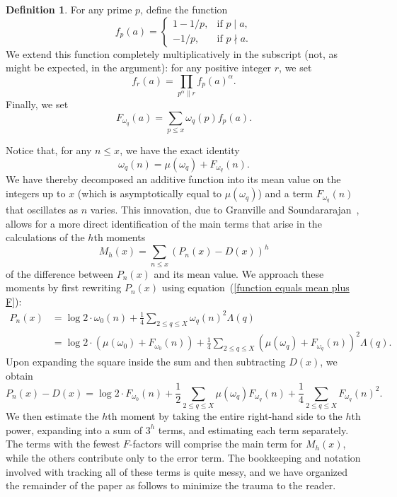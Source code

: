 \documentclass[12pt,reqno]{amsart}
\theoremstyle{definition}
\newtheorem{definition}[theorem]{Definition}
\begin{document}
\begin{definition}  \label{fF def}
For any prime $p$, define the function
\[
f_p(a) = \begin{cases} 1-1/p, &\text{if } p\mid a, \\ -1/p, &\text{if } p \nmid a.\end{cases}
\]
We extend this function completely multiplicatively in the subscript (not, as might be expected, in the argument): for any positive integer $r$, we set
\[
f_r(a) = \prod_{p^\alpha \parallel r} f_p(a)^\alpha.
\]
Finally, we set
\[
F_{\omega_q}(a) = \sum_{p\leq x} \omega_q(p) f_p(a).
\]
\end{definition}

Notice that, for any $n \leq x$, we have the exact identity
\begin{equation}\label{function equals mean plus F}
\omega_q(n) = \mu(\omega_q) + F_{\omega_q}(n).
\end{equation}
We have thereby decomposed an additive function into its mean value on the integers up to $x$ (which is asymptotically equal to $\mu(\omega_q)$) and a term $F_{\omega_q}(n)$ that oscillates as $n$ varies. This innovation, due to Granville and Soundararajan~\cite{gs07}, allows for a more direct identification of the main terms that arise in the calculations of the $h$th moments
\[
M_h(x) = \sum_{n \leq x} (P_n(x) - D(x))^h
\]
of the difference between $P_n(x)$ and its mean value. We approach these moments
by first rewriting $P_n(x)$ using equation~(\ref{function equals mean plus F}):
\begin{align*}
P_n(x) &= \log 2 \cdot \omega_0(n) + \frac14 \sum_{2\le q\le X} \omega_{q}(n)^2 \Lambda(q) \\
 &= \log 2 \cdot (\mu(\omega_0) + F_{\omega_0}(n)) + \frac14 \sum_{2\le q\le X} (\mu(\omega_q) + F_{\omega_q}(n))^2 \Lambda(q).
\end{align*}
Upon expanding the square inside the sum and then subtracting $D(x)$, we obtain
\begin{equation}\label{hth moment}
P_n(x) - D(x) = \log 2 \cdot F_{\omega_0}(n) + \frac12 \sum_{2\le q \leq X} \mu(\omega_q)F_{\omega_q}(n) + \frac14 \sum_{2\le q \leq X} F_{\omega_q}(n)^2.
\end{equation}
We then estimate the $h$th moment by taking the entire right-hand side to the $h$th power, expanding into a sum of $3^h$ terms, and estimating each term separately. The terms with the fewest $F$-factors will comprise the main term for $M_h(x)$, while the others contribute only to the error term. The bookkeeping and notation involved with tracking all of these terms is quite messy, and we have organized the remainder of the paper as follows to minimize the trauma to the reader.
\end{document}
